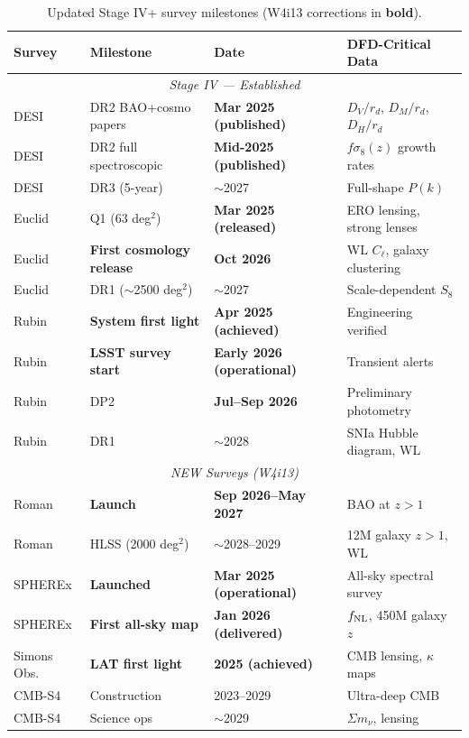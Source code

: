 \documentclass[11pt,a4paper]{article}
\begin{document}
\begin{table}[H]
\centering
\caption{Updated Stage IV+ survey milestones (W4i13 corrections in
\textbf{bold}).}
\label{tab:timelines}
\small
\begin{tabular}{llll}
\toprule
\textbf{Survey} & \textbf{Milestone} & \textbf{Date} &
\textbf{DFD-Critical Data} \\
\midrule
\multicolumn{4}{c}{\textit{Stage IV --- Established}} \\
\midrule
DESI & DR2 BAO+cosmo papers & \textbf{Mar 2025 (published)} &
$D_V/r_d$, $D_M/r_d$, $D_H/r_d$ \\
DESI & DR2 full spectroscopic & \textbf{Mid-2025 (published)} &
$f\sigma_8(z)$ growth rates \\
DESI & DR3 (5-year) & $\sim$2027 & Full-shape $P(k)$ \\
Euclid & Q1 (63 deg$^2$) & \textbf{Mar 2025 (released)} &
ERO lensing, strong lenses \\
Euclid & \textbf{First cosmology release} &
\textbf{Oct 2026} & WL $C_\ell$, galaxy clustering \\
Euclid & DR1 ($\sim$2500 deg$^2$) & $\sim$2027 &
Scale-dependent $S_8$ \\
Rubin & \textbf{System first light} &
\textbf{Apr 2025 (achieved)} & Engineering verified \\
Rubin & \textbf{LSST survey start} &
\textbf{Early 2026 (operational)} & Transient alerts \\
Rubin & DP2 & \textbf{Jul--Sep 2026} &
Preliminary photometry \\
Rubin & DR1 & $\sim$2028 & SNIa Hubble diagram, WL \\
\midrule
\multicolumn{4}{c}{\textit{NEW Surveys (W4i13)}} \\
\midrule
Roman & \textbf{Launch} &
\textbf{Sep 2026--May 2027} & BAO at $z > 1$ \\
Roman & HLSS (2000 deg$^2$) &
$\sim$2028--2029 & 12M galaxy $z > 1$, WL \\
SPHEREx & \textbf{Launched} &
\textbf{Mar 2025 (operational)} & All-sky spectral survey \\
SPHEREx & \textbf{First all-sky map} &
\textbf{Jan 2026 (delivered)} & $f_{\rm NL}$, 450M galaxy $z$ \\
Simons Obs. & \textbf{LAT first light} &
\textbf{2025 (achieved)} & CMB lensing, $\kappa$ maps \\
CMB-S4 & Construction & 2023--2029 & Ultra-deep CMB \\
CMB-S4 & Science ops & $\sim$2029 & $\Sigma m_\nu$, lensing \\

\end{tabular}
\end{table}
\end{document}
